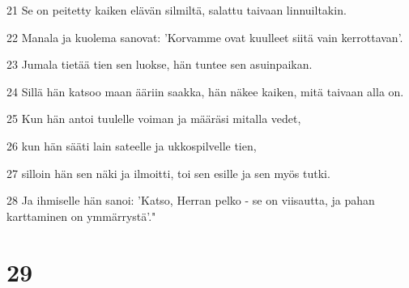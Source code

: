\par 21 Se on peitetty kaiken elävän silmiltä, salattu taivaan linnuiltakin.
\par 22 Manala ja kuolema sanovat: 'Korvamme ovat kuulleet siitä vain kerrottavan'.
\par 23 Jumala tietää tien sen luokse, hän tuntee sen asuinpaikan.
\par 24 Sillä hän katsoo maan ääriin saakka, hän näkee kaiken, mitä taivaan alla on.
\par 25 Kun hän antoi tuulelle voiman ja määräsi mitalla vedet,
\par 26 kun hän sääti lain sateelle ja ukkospilvelle tien,
\par 27 silloin hän sen näki ja ilmoitti, toi sen esille ja sen myös tutki.
\par 28 Ja ihmiselle hän sanoi: 'Katso, Herran pelko - se on viisautta, ja pahan karttaminen on ymmärrystä'."

\chapter{29}

